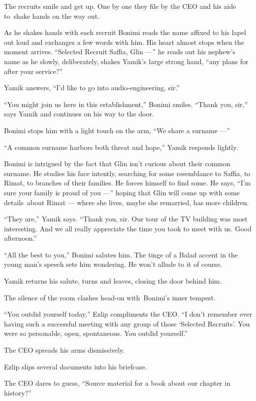 \documentclass[twoside,11pt]{book}
\begin{document}
The recruits smile and get up. One by one they file by the CEO and his aide to~shake hands on the way out.

As he shakes hands with each recruit Bonimi reads the name affixed to his lapel out loud and exchanges a few words
with him. His heart almost stops when the moment arrives. ``Selected Recruit Saffia, Glin ---'' he reads out his nephew's
name as he slowly, deliberately, shakes Yamik's large strong{ }hand, ``any
plans for after your service?''

Yamik answers, ``I'd like to go into audio-engineering, sir.''

``You might join us here in this establishment,'' Bonimi smiles. ``Thank you,
sir,'' says Yamik and continues on his way to the door.

Bonimi{ }stops{ }him with a light touch on the arm, ``We share a surname ---''

``A common surname harbors both threat and hope,'' Yamik responds lightly.

Bonimi is intrigued by the fact that Glin isn't curious about their common surname. He studies his face intently,
searching for some resemblance to Saffia, to Rimat, to branches of their families. He forces himself to find some. He
says, ``I'm sure your family{ }is proud of you ---'' hoping that Glin will
come up with some details~about Rimat --- where she lives, maybe she remarried, has more children.

``They are,'' Yamik says. ``Thank you, sir. Our tour of the TV building was most
interesting. And we all really appreciate the time you took to meet with us. Good afternoon.''

``All the best to you,'' Bonimi salutes him. The tinge of a Balad accent in the young man's
speech sets him wondering. He won't allude to it of course.

Yamik returns his salute, turns and leaves, closing the door behind him.

The silence of the room clashes head-on with~Bonimi's inner tempest.

``You outdid yourself today,'' Ezlip compliments the CEO. ``I don't remember
ever having such a successful meeting with any group of those `Selected Recruits'. You were so personable, open,
spontaneous. You outdid yourself.''

The CEO spreads his arms dismissively.

Ezlip slips several documents into his briefcase.\textbf{ }

The CEO dares to guess, ``Source material for a book about our chapter in history?''
\end{document}
